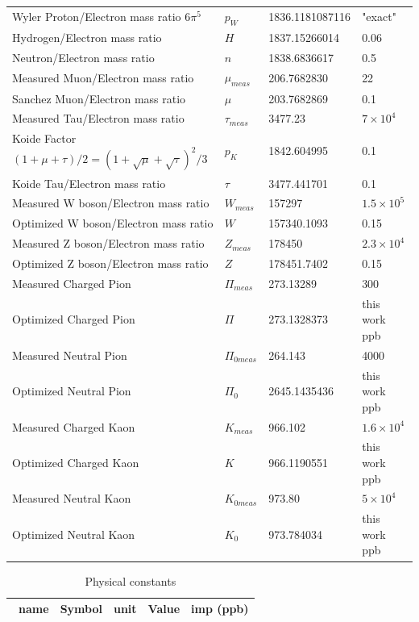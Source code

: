 \documentclass[a4paper,9pt]{article}
\begin{document}
\begin{appendix}
\begin{table}
\begin{tabular}{llll}
    Wyler Proton/Electron mass ratio $6\pi^5$ & $p_W$   & 1836.1181087116 & "exact" \\  
    Hydrogen/Electron mass ratio  & $H$  & 1837.15266014  & 0.06 \\      
    Neutron/Electron mass ratio  & $n$ & 1838.6836617  & 0.5 \\     
    Measured Muon/Electron mass ratio  & $\mu_{meas}$ & 206.7682830  & 22 \\     
    Sanchez Muon/Electron mass ratio  & $\mu$ & 203.7682869  & 0.1 \\     
    Measured Tau/Electron mass ratio  & $\tau_{meas}$ & 3477.23  & $7\times 10^4$ \\       
    Koide Factor $(1+\mu+\tau)/2 = (1+\sqrt\mu+\sqrt\tau)^2/3$ & $p_K$ & 1842.604995  & 0.1 \\ 
    Koide Tau/Electron mass ratio  & $\tau$ & 3477.441701  & 0.1 \\     
    Measured W boson/Electron mass ratio  & $W_{meas}$ & 157297  & $1.5 \times 10^5$ \\     
    Optimized  W boson/Electron mass ratio  & $W$ & 157340.1093  & 0.15 \\     
    Measured Z boson/Electron mass ratio  & $Z_{meas}$ & 178450  & $2.3 \times 10^4$ \\     
    Optimized  Z boson/Electron mass ratio  & $Z$ & 178451.7402  & 0.15 \\     
    Measured Charged Pion & $\Pi_{meas}$ & 273.13289  & 300 \\
    Optimized Charged Pion & $\Pi$ & 273.1328373  & this work ppb\\
    Measured Neutral Pion & $\Pi_{0meas}$ & 264.143 & 4000 \\
    Optimized Neutral Pion & $\Pi_0$ & 2645.1435436 & this work ppb \\
    Measured Charged Kaon & $K_{meas}$ & 966.102  & $1.6 \times 10^4$ \\
    Optimized Charged Kaon & $K$ & 966.1190551  & this work ppb  \\
    Measured Neutral Kaon & $ K_{0meas} $ & 973.80  & $ 5 \times 10^4$ \\    
    Optimized Neutral Kaon & $ K_0 $ & 973.784034 & this work ppb \\  
         
   \bottomrule
  \end{tabular}
\end{table}


\begin{table}
\caption{Physical constants}
\label{tab:2:table2}
  \hskip-2.0cm\begin{tabular}{lllll}
    \toprule
    \cmidrule(r){1-5}
    \ name & Symbol  & unit  & Value & imp (ppb) \\
    \midrule
  

\end{tabular}
\end{table}
\end{appendix}
\end{document}
